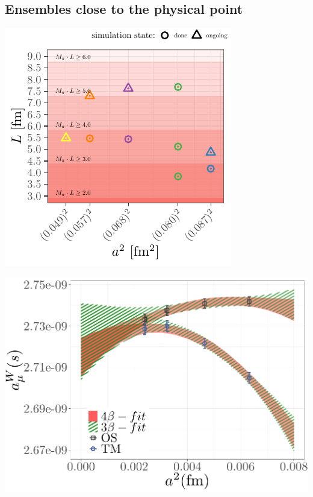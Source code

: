 \documentclass[a0,portrait]{a0poster}
\begin{document}
\begin{multicols}{2}
    \section{Ensembles close to the physical point}
    \begin{minipage}{0.49\linewidth}
        \includegraphics[width=\linewidth]{ensembles_phys_point}
    \end{minipage}
    \hfill
    \begin{minipage}{0.49\linewidth}
        \includegraphics[width=\linewidth]{amu_s_W_a4}
    \end{minipage}


\end{multicols}
\end{document}
